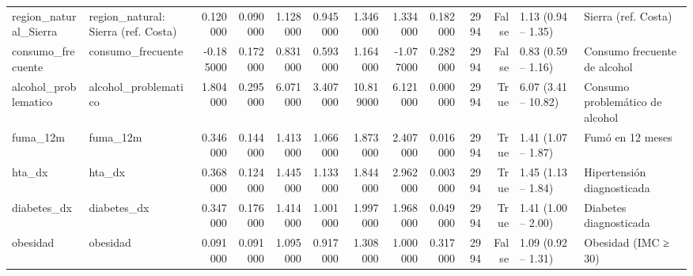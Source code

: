 \begin{table}[htbp]
\begin{tabular}{llrrrrrrrrrll}
region\_natural\_Sierra & region\_natural: Sierra (ref. Costa) & 0.120000 & 0.090000 & 1.128000 & 0.945000 & 1.346000 & 1.334000 & 0.182000 & 2994 & False & 1.13 (0.94 – 1.35) & Sierra (ref. Costa) \\
consumo\_frecuente & consumo\_frecuente & -0.185000 & 0.172000 & 0.831000 & 0.593000 & 1.164000 & -1.077000 & 0.282000 & 2994 & False & 0.83 (0.59 – 1.16) & Consumo frecuente de alcohol \\
alcohol\_problematico & alcohol\_problematico & 1.804000 & 0.295000 & 6.071000 & 3.407000 & 10.819000 & 6.121000 & 0.000000 & 2994 & True & 6.07 (3.41 – 10.82) & Consumo problemático de alcohol \\
fuma\_12m & fuma\_12m & 0.346000 & 0.144000 & 1.413000 & 1.066000 & 1.873000 & 2.407000 & 0.016000 & 2994 & True & 1.41 (1.07 – 1.87) & Fumó en 12 meses \\
hta\_dx & hta\_dx & 0.368000 & 0.124000 & 1.445000 & 1.133000 & 1.844000 & 2.962000 & 0.003000 & 2994 & True & 1.45 (1.13 – 1.84) & Hipertensión diagnosticada \\
diabetes\_dx & diabetes\_dx & 0.347000 & 0.176000 & 1.414000 & 1.001000 & 1.997000 & 1.968000 & 0.049000 & 2994 & True & 1.41 (1.00 – 2.00) & Diabetes diagnosticada \\
obesidad & obesidad & 0.091000 & 0.091000 & 1.095000 & 0.917000 & 1.308000 & 1.000000 & 0.317000 & 2994 & False & 1.09 (0.92 – 1.31) & Obesidad (IMC ≥ 30) \\
\bottomrule
\end{tabular}
\end{table}
